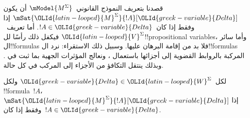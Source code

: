 \documentclass[../../../include/open-logic-section]{subfiles}
\begin{document}


قصدنا بتعريف النموذج القانوني~$\mModel{M^\Sigma}$ أن يكون
$\mSat{{\OLId{latin-looped}{M}}^\Sigma}{!A}[{\OLId{greek-variable}{Delta}}]$ إذا وفقط إذا كان~$!A \in {\OLId{greek-variable}{Delta}}$.
أما تعريف~${\OLId{latin-looped}{V}}^\Sigma$ فيكفل ذلك رأسًا لل!!{propositional
variable}s، وأما سائر ال!!{formula}s فلا بد من إقامة البرهان عليها.
وسبيل ذلك الاستقراء: نرد ال!!{formula}s المركبة بالروابط القضوية
إلى أجزائها باستعمال ،
ونعالج المؤثرات الجهية بما ثبت في .
وبذلك ينتقل التكافؤ من الأجزاء إلى المركب في كل حالة.

\begin{prop}[لمّة الصدق]
  لكل~${\OLId{greek-variable}{Delta}} \in {\OLId{latin-looped}{W}}^\Sigma$ ولكل !!{formula}~$!A$،
  $\mSat{{\OLId{latin-looped}{M}}^\Sigma}{!A}[{\OLId{greek-variable}{Delta}}]$ إذا وفقط إذا كان~$!A \in {\OLId{greek-variable}{Delta}}$.
\end{prop}
\end{document}
